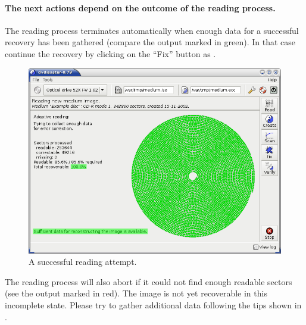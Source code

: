 \newpage
\paragraph{The next actions depend on the outcome of the reading process.} The
reading process terminates automatically when enough data for a successful
recovery has been gathered (compare the output marked in green). In that
case continue the recovery by clicking on the ``Fix'' button as
. 
\label{howto-recover-read-success}

\begin{figure}[h]
\centerline{\includegraphics[width=\textwidth]{screenshots/adaptive-success.png}}
\caption{A successful reading attempt.}  
\label{howto-recover-reading-success}
\end{figure}

\newpage

The reading process will also abort if it could not find enough readable
sectors (see the output marked in red). The image is not yet recoverable
in this incomplete state. Please try to gather additional data following
the tips shown in .

